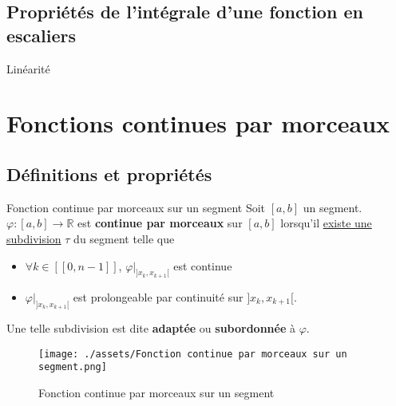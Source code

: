 \subsection{Propriétés de l'intégrale d'une fonction en escaliers} %
\label{sub:Propriétés de l'intégrale d'une fonction en escaliers}
Linéarité


\section{Fonctions continues par morceaux} %
\label{sec:Fonctions continues par morceaux}

\subsection{Définitions et propriétés} %
\label{sub:Définitions et propriétés}

\begin{Definition}[colbacktitle=red!75!black]{Fonction continue par morceaux sur un segment}{}
  Soit $[a,b]$ un segment. $\varphi : [a,b] \to \mathbb{R}$ est \textbf{continue par morceaux} sur $[a,b]$ lorsqu'il \underline{existe une subdivision} $\tau$ du segment telle que 
  \begin{itemize}

    \item $\forall k \in [\![0, n-1]\!]$, $\varphi| _{]x_k, x _{k+1}[}$ est continue
      
    \item $\varphi | _{]x_k, x _{k+1}[}$ est prolongeable par continuité sur $]x_k, x _{k+1}[$. 

  \end{itemize}
  Une telle subdivision est dite \textbf{adaptée} ou \textbf{subordonnée} à $\varphi$.

  \begin{figure}[H] %
    \centering
    \texttt{[image: ./assets/Fonction continue par morceaux sur un segment.png]}
    \caption{Fonction continue par morceaux sur un segment}
    \label{fig:Fonction continue par morceaux sur un segment}
  \end{figure}

  

\end{Definition}

